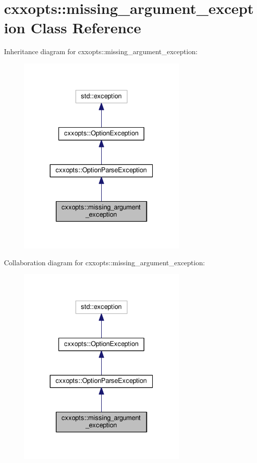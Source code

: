 \hypertarget{classcxxopts_1_1missing__argument__exception}{}\section{cxxopts\+:\+:missing\+\_\+argument\+\_\+exception Class Reference}
\label{classcxxopts_1_1missing__argument__exception}


Inheritance diagram for cxxopts\+:\+:missing\+\_\+argument\+\_\+exception\+:
\nopagebreak
\begin{figure}[H]
\begin{center}
\leavevmode
\includegraphics[width=235pt]{classcxxopts_1_1missing__argument__exception__inherit__graph}
\end{center}
\end{figure}


Collaboration diagram for cxxopts\+:\+:missing\+\_\+argument\+\_\+exception\+:
\nopagebreak
\begin{figure}[H]
\begin{center}
\leavevmode
\includegraphics[width=235pt]{classcxxopts_1_1missing__argument__exception__coll__graph}
\end{center}
\end{figure}
